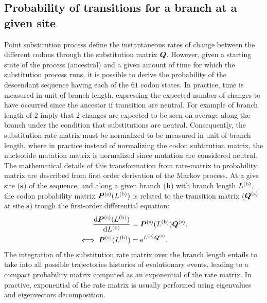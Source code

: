 \subsection{Probability of transitions for a branch at a given site}
Point substitution process define the instantaneous rates of change between the different codons through the substitution matrix $\bm{Q}$.
However, given a starting state of the process (ancestral) and a given amount of time for which the substitution process runs, it is possible to derive the probability of the descendant sequence having each of the $61$ codon states.
In practice, time is measured in unit of branch length, expressing the expected number of changes to have occurred since the ancestor if transition are neutral.
For example of branch length of $2$ imply that $2$ changes are expected to be seen on average along the branch under the condition that substitutions are neutral.
Consequently, the substitution rate matrix must be normalized to be measured in unit of branch length, where in practice instead of normalizing the codon subtitution matrix, the nucleotide mutation matrix is normalized since mutation are considered neutral.
The mathematical details of this transformation from rate-matrix to probability matrix are described from first order derivation of the Markov process.
At a give site ($\text{s}$) of the sequence, and along a given branch ($\text{b}$) with branch length $L^{(\text{b})}$, the codon probability matrix $\bm{P}^{(\text{s})}(L^{(\text{b})})$ is related to the transition matrix ($\bm{Q}^{(\text{s})}$ at site $\text{s}$) trough the first-order differential equation:
\begin{align}
	\dfrac{\mathrm{d} \bm{P}^{(\text{s})}(L^{(\text{b})})}{\mathrm{d} L^{(\text{b})}}	& = \bm{P}^{(\text{s})}(L^{(\text{b})}) \bm{Q}^{(\text{s})}, \\
	\iff \bm{P}^{(\text{s})}(L^{(\text{b})}) & = \mathrm{e}^{L^{(\text{b})} \bm{Q}^{(\text{s})}}.
\end{align}
The integration of the substitution rate matrix over the branch length entails to take into all possible trajectories histories of evolutionary events, leading to a compact probability matrix computed as an exponential of the rate matrix.
In practive, exponential of the rate matrix is usually performed using eigenvalues and eigenvectors decomposition.

